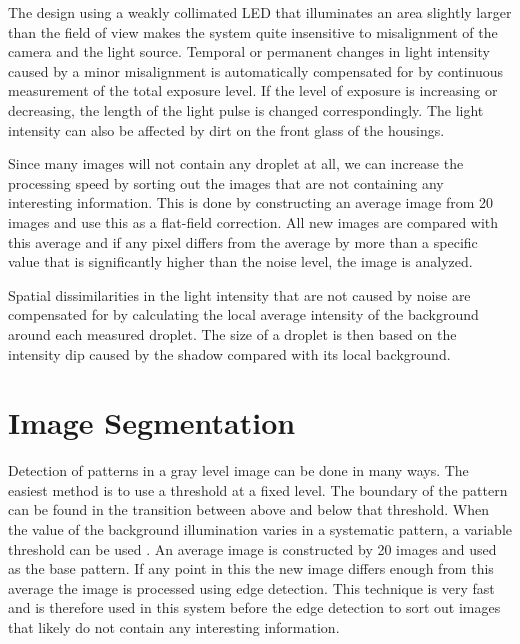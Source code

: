 The design using a weakly collimated LED that illuminates an area slightly larger than the field of view makes the system quite insensitive to misalignment of the camera and the light source. Temporal or permanent changes in light intensity caused by a minor misalignment is automatically compensated for by continuous measurement of the total exposure level. If the level of exposure is increasing or decreasing, the length of the light pulse is changed correspondingly. The light intensity can also be affected by dirt on the front glass of the housings. 

Since many images will not contain any droplet at all, we can increase the processing speed by sorting out the images that are not containing any interesting information. This is done by constructing an average image from 20 images and use this as a flat-field correction. All new images are compared with this average and if any pixel differs from the average by more than a specific value that is significantly higher than the noise level, the image is analyzed.

Spatial dissimilarities in the light intensity that are not caused by noise are compensated for by calculating the local average intensity of the background around each measured droplet. The size of a droplet is then based on the intensity dip caused by the shadow compared with its local background.


\section{Image Segmentation}
\label{imgsegment}

Detection of patterns in a gray level image can be done in many ways. The easiest method is to use a threshold at a fixed level. The boundary of the pattern can be found in the transition between above and below that threshold. When the value of the background illumination varies in a systematic pattern, a variable threshold can be used \cite{gonz2002}. An average image is constructed by 20 images and used as the base pattern. If any point in this the new image differs enough from this average the image is processed using edge detection. This technique is very fast and is therefore used in this system before the edge detection to sort out images that likely do not contain any interesting information.


